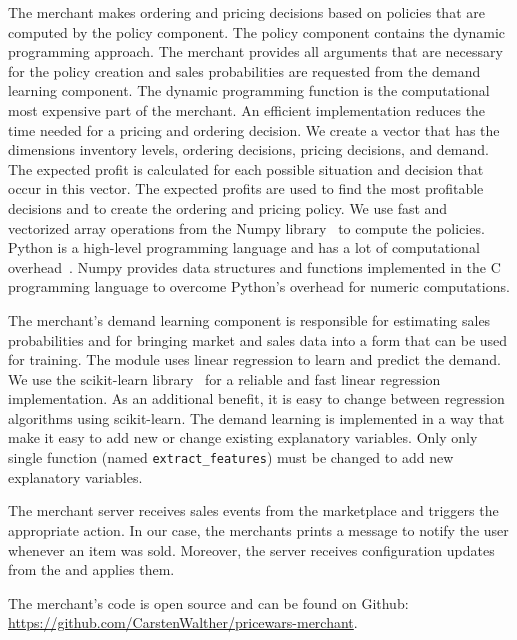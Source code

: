 The merchant makes ordering and pricing decisions based on policies that are computed by the policy component.
The policy component contains the dynamic programming approach.
The merchant provides all arguments that are necessary for the policy creation and sales probabilities are requested from the demand learning component.
The dynamic programming function is the computational most expensive part of the merchant.
An efficient implementation reduces the time needed for a pricing and ordering decision.
We create a vector that has the dimensions inventory levels, ordering decisions, pricing decisions, and demand.
The expected profit is calculated for each possible situation and decision that occur in this vector.
The expected profits are used to find the most profitable decisions and to create the ordering and pricing policy.
We use fast and vectorized array operations from the Numpy library~\cite{dubois1996numerical} to compute the policies.
Python is a high-level programming language and has a lot of computational overhead~\cite{DBLP:journals/cse/BehnelBCDSS11}.
Numpy provides data structures and functions implemented in the C programming language to overcome Python's overhead for numeric computations.

The merchant's demand learning component is responsible for estimating sales probabilities and for bringing market and sales data into a form that can be used for training.
The module uses linear regression to learn and predict the demand.
We use the scikit-learn library~\cite{DBLP:journals/jmlr/PedregosaVGMTGBPWDVPCBPD11} for a reliable and fast linear regression implementation.
As an additional benefit, it is easy to change between regression algorithms using scikit-learn.
The demand learning is implemented in a way that make it easy to add new or change existing explanatory variables.
Only only single function (named \texttt{extract\_features}) must be changed to add new explanatory variables.

The merchant server receives sales events from the marketplace and triggers the appropriate action.
In our case, the merchants prints a message to notify the user whenever an item was sold.
Moreover, the server receives configuration updates from the \ui and applies them.  

The merchant's code is open source and can be found on Github: \url{https://github.com/CarstenWalther/pricewars-merchant}.

